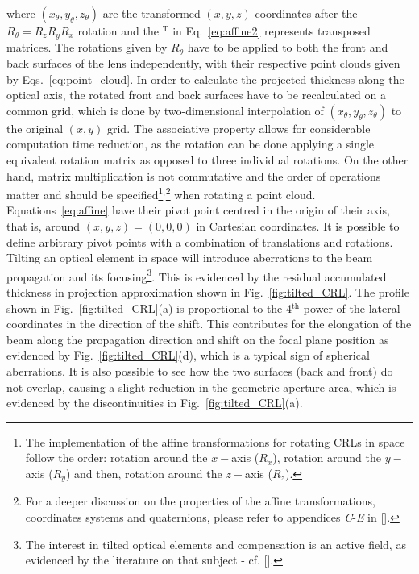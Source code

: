 \begin{refsection}
where $(x_\theta,y_\theta,z_\theta)$ are the transformed $(x,y,z)$ coordinates after the $R_{\theta}=R_zR_yR_x$ rotation and the $^\text{T}$ in Eq.~\ref{eq:affine2} represents transposed matrices. The rotations given by $R_{\theta}$ have to be applied to both the front and back surfaces of the lens independently, with their respective point clouds given by Eqs.~\ref{eq:point_cloud}. In order to calculate the projected thickness along the optical axis, the rotated front and back surfaces have to be recalculated on a common grid, which is done by two-dimensional interpolation of $(x_\theta,y_\theta,z_\theta)$ to the original $(x,y)$ grid. The associative property allows for considerable computation time reduction, as the rotation can be done applying a single equivalent rotation matrix as opposed to three individual rotations. On the other hand, matrix multiplication is not commutative and the order of operations matter and should be specified\footnote{The implementation of the affine transformations for rotating CRLs in space follow the order: rotation around the $x-$axis ($R_x$), rotation around the $y-$axis ($R_y$) and then, rotation around the $z-$axis ($R_z$).}$^{,}$\footnote{For a deeper discussion on the properties of the affine transformations, coordinates systems and quaternions, please refer to appendices \textit{C}-\textit{E} in [\cite{House2016}].} when rotating a point cloud. Equations~\ref{eq:affine} have their pivot point centred in the origin of their axis, that is, around $(x,y,z)=(0,0,0)$ in Cartesian coordinates. It is possible to define arbitrary pivot points with a combination of translations and rotations. Tilting an optical element in space will introduce aberrations to the beam propagation and its focusing\footnote{The interest in tilted optical elements and compensation is an active field, as evidenced by the literature on that subject - cf. [\cite{Guizar-Sicairos2011,Zhou2019,Ali2020}].}. This is evidenced by the residual accumulated thickness in projection approximation shown in Fig.~\ref{fig:tilted_CRL}. The profile shown in Fig.~\ref{fig:tilted_CRL}(a) is proportional to the 4$^{\text{th}}$ power of the lateral coordinates in the direction of the shift. This contributes for the elongation of the beam along the propagation direction and shift on the focal plane position as evidenced by Fig.~\ref{fig:tilted_CRL}(d), which is a typical sign of spherical aberrations. It is also possible to see how the two surfaces (back and front) do not overlap, causing a slight reduction in the geometric aperture area, which is evidenced by the discontinuities in Fig.~\ref{fig:tilted_CRL}(a).


\end{refsection}
